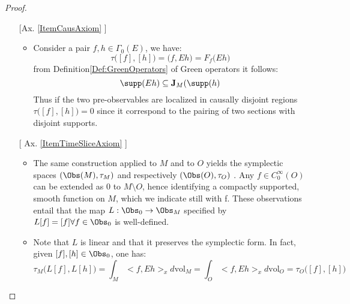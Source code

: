 \documentclass[Main]{subfiles}
\begin{document}
				\begin{proof}
					\begin{itemize}
						\item[ [Ax. \ref{ItemCausAxiom}]]
							\begin{itemize}
								\item Consider a pair $f,h \in \Gamma_0 (E)$, we have: 
									\begin{displaymath}
										\tau \big([f] , [h] \big) = \big(f, Eh \big) = F_f \big( E h \big)
									\end{displaymath}
									from Definition\ref{Def:GreenOperators} of Green operators it follows:
									\begin{displaymath}
										\supp ( E h) \subseteq \textbf{J}_M ( \supp(h)
									\end{displaymath}
									Thus if the two pre-observables are localized in causally disjoint regions $\tau \big([f] , [h] \big)=0 $ since it correspond to the pairing of two sections with disjoint supports.	
							\end{itemize}
						\item[[ Ax. \ref{ItemTimeSliceAxiom}]]
							\begin{itemize}
								\item %
									The same construction applied to $M$ and to $O$ yields the symplectic spaces $(\Obs(M),\tau_M)$ and respectively $(\Obs(O),\tau_O)$ . 
									Any $f\in C^\infty_0(O)$ can be extended as $0$ to $M\setminus O$, hence identifying a compactly supported, smooth function on $M$, which we indicate still with f.
									These observations entail that the map $L: \Obs_0 \rightarrow \Obs_M$ specified by $L [f]= [f] \forall f \in \Obs_0$ is well-defined.
								\item %
									Note that $L$ is linear and that it preserves the symplectic form. In fact, given $[ f ], [h] \in \Obs_0$, one has:
									\begin{displaymath}
										\tau_M \big(L[f], L[h] \big)= \int_M <f, Eh>_x d\textrm{vol}_M =
										 \int_O <f, Eh>_x d\textrm{vol}_O = \tau_O \big([f],[h])
									\end{displaymath}

\end{itemize}
\end{itemize}
\end{proof}
\end{document}
